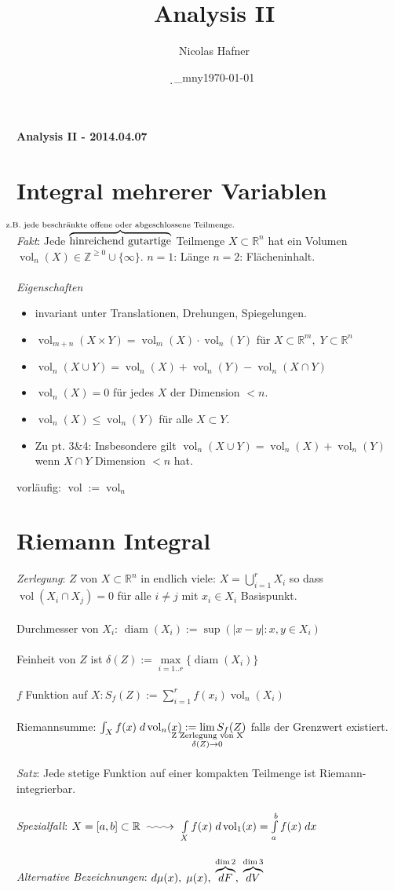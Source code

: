 \documentclass[12pt,a4paper,titlepage]{article}
\author{Nicolas Hafner}
\title{Analysis II}
\date{\d_mny\today}
\makeatletter
\newcommand{\longsquiggly}{\xymatrix{{}\ar@{~>}[r]&{}}}
\newcommand{\setR}{\mathbb{R}}
\newcommand{\setN}{\mathbb{Z}^{\geq0}}
\newcommand{\vol}{\operatorname{vol}}
\newcommand{\diam}{\operatorname{diam}}
\makeatother
\begin{document}
	
\begin{center}{\bfseries\Huge Analysis II - 2014.04.07}\end{center}
\section*{Integral mehrerer Variablen}
\textit{Fakt}: Jede $\overbrace{\text{hinreichend gutartige}}^{\mathclap{\text{z.B. jede beschränkte offene oder abgeschlossene Teilmenge.}}}$ Teilmenge $X\subset\setR^n$ hat ein Volumen $\vol_n(X)\in\setN\cup\{\infty\}$. $n=1$: Länge $n=2$: Flächeninhalt. \\
\\
\textit{Eigenschaften}\begin{itemize}
\item invariant unter Translationen, Drehungen, Spiegelungen.
\item $\vol_{m+n}(X\times Y)=\vol_m(X)\cdot\vol_n(Y)$ für $X\subset\setR^m,\; Y\subset\setR^n$
\item $\vol_n(X\cup Y)=\vol_n(X)+\vol_n(Y)-\vol_n(X\cap Y)$
\item $\vol_n(X)=0$ für jedes $X$ der Dimension $< n$.
\item $\vol_n(X)\leq\vol_n(Y)$ für alle $X\subset Y$.
\item Zu pt. 3\&4: Insbesondere gilt $\vol_n(X\cup Y)=\vol_n(X)+\vol_n(Y)$ wenn $X\cap Y$ Dimension $<n$ hat.
\end{itemize}
vorläufig: $\vol:=\vol_n$
\section*{Riemann Integral}
\textit{Zerlegung}: $Z$ von $X\subset\setR^n$ in endlich viele: $X=\bigcup\limits_{i=1}^r X_i$ so dass $\vol(X_i\cap X_j)=0$ für alle $i\neq j$ mit $x_i\in X_i$ Basispunkt. \\
\\
Durchmesser von $X_i$: $\diam(X_i):=\sup(|x-y|:x,y\in X_i)$\\
\\
Feinheit von $Z$ ist $\delta(Z):=\max\limits_{i=1..r}\{\diam(X_i)\}$ \\
\\
$f$ Funktion auf $X: S_f(Z):=\sum\limits_{i=1}^rf(x_i)\vol_n(X_i)$\\
\\
Riemannsumme: $\int_X f(x)\; d\vol_n(x):=\lim\limits_{\mathclap{\substack{\text{Z Zerlegung von X}\\\delta(Z)\to 0}}}S_f(Z)$ \quad falls der Grenzwert existiert. \\
\\
\textit{Satz}: Jede stetige Funktion auf einer kompakten Teilmenge ist Riemann-integrierbar. \\
\\
\textit{Spezialfall}: $X=[a,b]\subset\setR \longsquiggly \int\limits_Xf(x) \;d\vol_1(x)=\int\limits_a^bf(x) \;dx$ \\
\\
\textit{Alternative Bezeichnungen}: $d\mu(x),\;\mu(x),\;\overbrace{dF}^{\mathclap{\dim 2}},\;\overbrace{dV}^{\mathclap{\dim 3}}$ 
\end{document}
